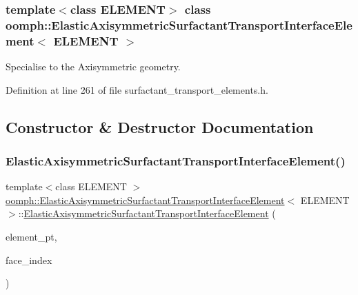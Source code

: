 \subsubsection*{template$<$class E\+L\+E\+M\+E\+NT$>$\newline
class oomph\+::\+Elastic\+Axisymmetric\+Surfactant\+Transport\+Interface\+Element$<$ E\+L\+E\+M\+E\+N\+T $>$}

Specialise to the Axisymmetric geometry. 

Definition at line 261 of file surfactant\+\_\+transport\+\_\+elements.\+h.



\subsection{Constructor \& Destructor Documentation}
\mbox{\label{classoomph_1_1ElasticAxisymmetricSurfactantTransportInterfaceElement_a7e0f4dbf25bf0556a2675e599eeb6365}} 
\subsubsection{\texorpdfstring{Elastic\+Axisymmetric\+Surfactant\+Transport\+Interface\+Element()}{ElasticAxisymmetricSurfactantTransportInterfaceElement()}}
{\footnotesize\ttfamily template$<$class E\+L\+E\+M\+E\+NT $>$ \\
\hyperlink{classoomph_1_1ElasticAxisymmetricSurfactantTransportInterfaceElement}{oomph\+::\+Elastic\+Axisymmetric\+Surfactant\+Transport\+Interface\+Element}$<$ E\+L\+E\+M\+E\+NT $>$\+::\hyperlink{classoomph_1_1ElasticAxisymmetricSurfactantTransportInterfaceElement}{Elastic\+Axisymmetric\+Surfactant\+Transport\+Interface\+Element} (\begin{DoxyParamCaption}\item[{Finite\+Element $\ast$const \&}]{element\+\_\+pt,  }\item[{const int \&}]{face\+\_\+index }\end{DoxyParamCaption})\hspace{0.3cm}{\ttfamily [inline]}}




